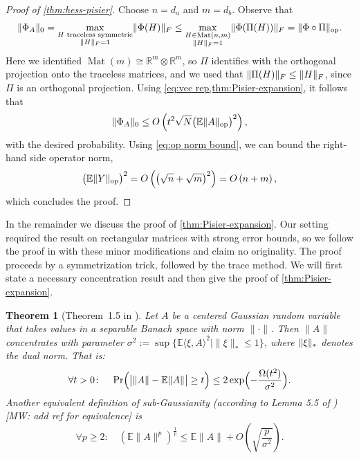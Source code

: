 \documentclass[aos]{imsart}
\newtheorem{theorem}{Theorem}[section]
\theoremstyle{definition}
\numberwithin{equation}{section}
\DeclareMathOperator{\op}{op}
\DeclareMathOperator{\Mat}{Mat}
\DeclarePairedDelimiter{\abs}{\lvert}{\rvert}
\DeclarePairedDelimiter{\norm}{\lVert}{\rVert}
\newcommand{\R}{{\mathbb{R}}}
\newcommand{\ot}{\otimes}
\newcommand{\E}{\mathbb{E}}
\newcommand{\MW}[1]{{\color{red}[MW: #1]}}
\begin{document}
\begin{appendix}
\begin{proof}[Proof of \cref{thm:hess-pisier}]
Choose $n=d_a$ and $m=d_b$.
Observe that
\begin{align*}
  \norm{\Phi_A}_0
= \max_{\substack{H \text{ traceless symmetric} \\ \norm H_F=1}} \norm{\Phi(H)}_F
\leq %
\max_{\substack{H \in \Mat(n,m) \\ \norm H_F = 1}} \norm{\Phi(\Pi(H))}_F
= \norm{\Phi \circ \Pi}_{\op}.
\end{align*}
Here we identified $\Mat(m) \cong \R^m \ot \R^m$, so $\Pi$ identifies with the orthogonal projection onto the traceless matrices, and we used that $\norm{\Pi(H)}_F \leq \norm{H}_F$, since $\Pi$ is an orthogonal projection.
Using \cref{eq:vec rep,thm:Pisier-expansion}, it follows that
\begin{align*}
  \norm{\Phi_A}_0 \leq O\left( t^2 \sqrt{N} \bigl( \E \norm{A}_{\op} \bigr)^2 \right),
\end{align*}
with the desired probability.
Using \cref{eq:op norm bound}, we can bound the right-hand side operator norm,
\begin{align*}
  \bigl( \E \norm{Y}_{\op} \bigr)^2
= O\left( \left( \sqrt{n} + \sqrt{m} \right)^2 \right)
= O\left(n+m\right),
\end{align*}
which concludes the proof.
\end{proof}

In the remainder we discuss the proof of \cref{thm:Pisier-expansion}.
Our setting required the result on rectangular matrices with strong error bounds, so we follow the proof in \cite{pisier2012grothendieck} with these minor modifications and claim no originality.
The proof proceeds by a symmetrization trick, followed by the trace method.
We will first state a necessary concentration result and then give the proof of \cref{thm:Pisier-expansion}.

\begin{theorem}[Theorem~1.5 in \cite{P86}]\label{thm:banach conc}
Let $A$ be a centered Gaussian random variable that takes values in a separable Banach space with norm $\|\cdot\|$.
Then $\|A\|$ concentrates with parameter $\sigma^2 := \sup \{ \E \langle \xi, A \rangle^{2} \mid \|\xi\|_{*} \leq 1 \}$, where $\norm{\xi}_*$ denotes the dual norm.
That is:
\[ \forall t > 0 \colon \quad \Pr\Bigl( \abs[\big]{\norm A - \E \norm A} \geq t\Bigr) \leq 2 \exp\Bigl( - \frac{\Omega(t^2)}{\sigma^{2}}\Bigr).   \]
Another equivalent definition of sub-Gaussianity (according to Lemma 5.5 of \cite{vershynin2010introduction}) \MW{add ref for equivalence} is
\begin{equation}\label{eq:conc via moments}
  \forall p \geq 2 \colon \quad (\E \|A\|^{p})^{\frac{1}{p}} \leq \E \|A\| + O \left( \sqrt{\frac{p}{\sigma^{2}}} \right).
\end{equation}
\end{theorem}


\end{appendix}
\end{document}
